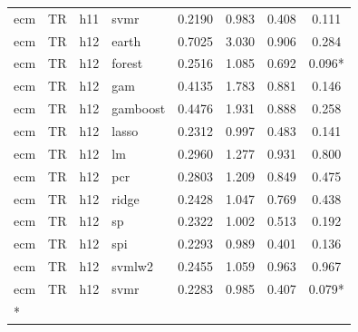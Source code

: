 \begin{ThreePartTable}
\begin{longtable}[t]{llclcccc}
ecm & TR & h11 & svmr & 0.2190 & 0.983 & 0.408 & 0.111\\
\addlinespace
ecm & TR & h12 & earth & 0.7025 & 3.030 & 0.906 & 0.284\\
ecm & TR & h12 & forest & 0.2516 & 1.085 & 0.692 & 0.096*\\
ecm & TR & h12 & gam & 0.4135 & 1.783 & 0.881 & 0.146\\
ecm & TR & h12 & gamboost & 0.4476 & 1.931 & 0.888 & 0.258\\
ecm & TR & h12 & lasso & 0.2312 & 0.997 & 0.483 & 0.141\\
ecm & TR & h12 & lm & 0.2960 & 1.277 & 0.931 & 0.800\\
ecm & TR & h12 & pcr & 0.2803 & 1.209 & 0.849 & 0.475\\
ecm & TR & h12 & ridge & 0.2428 & 1.047 & 0.769 & 0.438\\
ecm & TR & h12 & sp & 0.2322 & 1.002 & 0.513 & 0.192\\
ecm & TR & h12 & spi & 0.2293 & 0.989 & 0.401 & 0.136\\
ecm & TR & h12 & svmlw2 & 0.2455 & 1.059 & 0.963 & 0.967\\
ecm & TR & h12 & svmr & 0.2283 & 0.985 & 0.407 & 0.079*\\*
\end{longtable}
\end{ThreePartTable}
\endgroup{}

